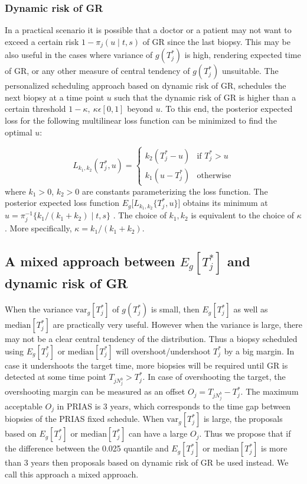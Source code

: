 \subsubsection{Dynamic risk of GR}
\label{subsubsec : dynamic_risk_definitions}
In a practical scenario it is possible that a doctor or a patient may not want to exceed a certain risk $1 - \pi_j(u \mid t, s)$ of GR since the last biopsy. This may be also useful in the cases where variance of $g(T^*_j)$ is high, rendering expected time of GR, or any other measure of central tendency of $g(T^*_j)$ unsuitable. The personalized scheduling approach based on dynamic risk of GR, schedules the next biopsy at a time point $u$ such that the dynamic risk of GR is higher than a certain threshold $1-\kappa,\ \kappa \epsilon [0,1]$ beyond $u$. To this end, the posterior expected loss for the following multilinear loss function can be minimized to find the optimal $u$:

\begin{equation}
\label{eq : loss_dynamic_risk}
L_{k_1, k_2}(T^*_j, u) =
    \begin{cases}
      k_2(T^*_j-u) & \text{if } T^*_j > u\\
      k_1(u-T^*_j) & \text{otherwise}
    \end{cases}       
\end{equation}
where $k_1 > 0$, $k_2 > 0$ are constants parameterizing the loss function. The posterior expected loss function $E_g\big[L_{k_1, k_2}\{T^*_j, u\}\big]$ obtains its minimum at $u = \pi_j^{-1}\big\{k_1/{(k_1 + k_2)} \mid t,s \big\}$ \citep{robertBayesianChoice}. The choice of $k_1, k_2$ is equivalent to the choice of $\kappa$. More specifically, $\kappa = {k_1}/{(k_1 + k_2)}$.

\subsection{A mixed approach between $E_g[T^*_j]$ and dynamic risk of GR}
\label{subsec : mixed_approach}
When the variance $\mbox{var}_g[T^*_j]$ of $g(T^*_j)$ is small, then $E_g[T^*_j]$ as well as $\mbox{median}[T^*_j]$ are practically very useful. However when the variance is large, there may not be a clear central tendency of the distribution. Thus a biopsy scheduled using $E_g[T^*_j]$ or $\mbox{median}[T^*_j]$ will overshoot/undershoot $T^*_j$ by a big margin. In case it undershoots the target time, more biopsies will be required until GR is detected at some time point $T_{j{N_j^b}} >  T^*_j$. In case of overshooting the target, the overshooting margin can be measured as an offset $O_j = T_{j{N_j^b}} - T_j^*$. The maximum acceptable $O_j$ in PRIAS is 3 years, which corresponds to the time gap between biopsies of the PRIAS fixed schedule. When $\mbox{var}_g[T^*_j]$ is large, the proposals based on $E_g[T^*_j]$ or $\mbox{median}[T^*_j]$ can have a large $O_j$. Thus we propose that if the difference between the 0.025 quantile and $E_g[T^*_j]$ or $\mbox{median}[T^*_j]$ is more than 3 years then proposals based on dynamic risk of GR be used instead. We call this approach a mixed approach.

